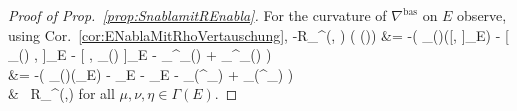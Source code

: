 \begin{proof}[Proof of Prop.~\ref{prop:SnablamitREnabla}]
\leavevmode\newline
For the curvature of $\nabla^{\mathrm{bas}}$ on $E$ observe, using Cor.~\ref{cor:ENablaMitRhoVertauschung},
\bas
-R_\nabla^{}(\mu, \nu) \bigl( \rho(\eta)\bigr)
&=
-\mleft(
	\nabla_{\rho(\eta)}([\mu, \nu]_E) 
	- [ \nabla_{\rho(\eta)} \mu, \nu ]_E 
	- [ \mu, \nabla_{\rho(\eta)} \nu ]_E 
	- \nabla_{\nabla^{}_\nu \rho(\eta)} \mu 
	+ \nabla_{\nabla^{}_\mu \rho(\eta)} \nu
\mright)
\\
&=
-\mleft(
	\nabla_{\rho(\eta)}\mleft(\mleft[\mu, \nu\mright]_E\mright) 
	- \mleft[ \nabla_{\rho(\eta)} \mu, \nu \mright]_E 
	- \mleft[ \mu, \nabla_{\rho(\eta)} \nu \mright]_E 
	- \nabla_{\rho\mleft(\nabla^{}_\nu \eta\mright)} \mu 
	+ \nabla_{\rho\mleft(\nabla^{}_\mu \eta\mright)} \nu
\mright)
\\
&\quad~
R_{\nabla^{}}(\mu,\nu)\eta
\eas
for all $\mu, \nu, \eta \in \Gamma(E)$.

\end{proof}
